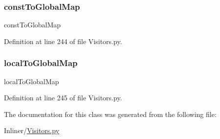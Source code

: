 \subsubsection{\texorpdfstring{const\+To\+Global\+Map}{constToGlobalMap}}
{\footnotesize\ttfamily const\+To\+Global\+Map}



Definition at line 244 of file Visitors.\+py.

\mbox{\label{classVisitors_1_1ConstantMerger_a6aa7ad73b0ac6388e786fd93172a1421}} 
\subsubsection{\texorpdfstring{local\+To\+Global\+Map}{localToGlobalMap}}
{\footnotesize\ttfamily local\+To\+Global\+Map}



Definition at line 245 of file Visitors.\+py.



The documentation for this class was generated from the following file\+:\begin{DoxyCompactItemize}
\item 
Inliner/\hyperlink{Visitors_8py}{Visitors.\+py}\end{DoxyCompactItemize}
